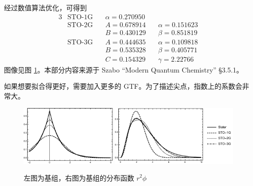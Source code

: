 {经过数值算法优化，可得到
\begin{alignat}{3}
    &\text{STO-1G}\quad&\alpha = \num{0.270950} \quad&{}\\
    &\text{STO-2G}\quad&A = \num{0.678914} \quad &\alpha = \num{0.151623} \\
    & &B = \num{0.430129}\quad &\beta = \num{0.851819} \\
    &\text{STO-3G}\quad &A = \num{0.444635} \quad&\alpha = \num{0.109818} \\
    &&B = \num{0.535328}\quad&\beta = \num{0.405771}\\
    &&C = \num{0.154329}\quad&\gamma = \num{2.22766}
\end{alignat}
图像见图 \ref{fig:STO_GTO}。本部分内容来源于 Szabo ``Modern Quantum Chemistry'' \S 3.5.1。

如果想要拟合得更好，需要加入更多的 GTF。为了描述尖点，指数上的系数会非常大。
}
\begin{figure}[tbp]
    \includegraphics[height=3cm]{fig/STO_vs_GTO.pdf}
    \includegraphics[height=3cm]{fig/STO_RDF.pdf}
    \caption{左图为基组，右图为基组的分布函数 $r^2\phi$}
    \label{fig:STO_GTO}
\end{figure}

